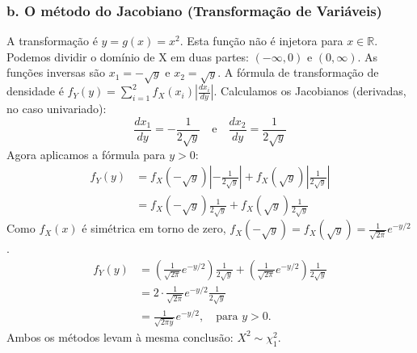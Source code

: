 \documentclass[12pt]{article}
\begin{document}
\subsubsection*{b. O método do Jacobiano (Transformação de Variáveis)}
A transformação é $y=g(x)=x^2$. Esta função não é injetora para $x \in \mathbb{R}$. Podemos dividir o domínio de X em duas partes: $(-\infty, 0)$ e $(0, \infty)$.
As funções inversas são $x_1 = -\sqrt{y}$ e $x_2 = \sqrt{y}$.
A fórmula de transformação de densidade é $f_Y(y) = \sum_{i=1}^{2} f_X(x_i) \left| \frac{dx_i}{dy} \right|$.
Calculamos os Jacobianos (derivadas, no caso univariado):
\[ \frac{dx_1}{dy} = -\frac{1}{2\sqrt{y}} \quad \text{e} \quad \frac{dx_2}{dy} = \frac{1}{2\sqrt{y}} \]
Agora aplicamos a fórmula para $y>0$:
\begin{align*}
    f_Y(y) &= f_X(-\sqrt{y}) \left| -\frac{1}{2\sqrt{y}} \right| + f_X(\sqrt{y}) \left| \frac{1}{2\sqrt{y}} \right| \\
    &= f_X(-\sqrt{y}) \frac{1}{2\sqrt{y}} + f_X(\sqrt{y}) \frac{1}{2\sqrt{y}}
\end{align*}
Como $f_X(x)$ é simétrica em torno de zero, $f_X(-\sqrt{y}) = f_X(\sqrt{y}) = \frac{1}{\sqrt{2\pi}}e^{-y/2}$.
\begin{align*}
    f_Y(y) &= \left( \frac{1}{\sqrt{2\pi}}e^{-y/2} \right) \frac{1}{2\sqrt{y}} + \left( \frac{1}{\sqrt{2\pi}}e^{-y/2} \right) \frac{1}{2\sqrt{y}} \\
    &= 2 \cdot \frac{1}{\sqrt{2\pi}}e^{-y/2} \frac{1}{2\sqrt{y}} \\
    &= \frac{1}{\sqrt{2\pi y}} e^{-y/2}, \quad \text{para } y > 0.
\end{align*}
Ambos os métodos levam à mesma conclusão: $X^2 \sim \chi^2_1$. \hfill \qedsymbol
\end{document}
